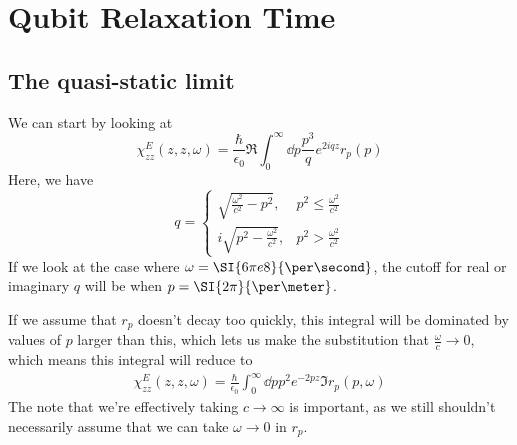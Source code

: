 \documentclass[../../main.tex]{subfiles}
\begin{document}
\section{Qubit Relaxation Time}

\subsection{The quasi-static limit}
We can start by looking at
\begin{equation}
	\chi_{zz}^{E}(z, z, \omega) = \frac{\hbar}{\epsilon_0}\Re\int_0^\infty \dd{p} \frac{p^3}{q} e^{2iqz}r_p(p)
\end{equation}
Here, we have
\begin{equation}
	q = \begin{cases}
			\sqrt{\frac{\omega^2}{c^2} - p^2}, & p^2 \le  \frac{\omega^2}{c^2} \\
			i \sqrt{p^2 - \frac{\omega^2}{c^2}}, & p^2 > \frac{\omega^2}{c^2}
		\end{cases}
\end{equation}
If we look at the case where $\omega = \SI{6\pi e8}{\per\second}$, the cutoff for real or imaginary $q$ will be when $p = \SI{2\pi}{\per\meter}$.

If we assume that $r_p$ doesn't decay too quickly, this integral will be dominated by values of $p$ larger than this, which lets us make the substitution that $\frac{\omega}{c} \rightarrow 0$, which means this integral will reduce to
\begin{align}
	\chi_{zz}^{E}(z, z, \omega) = \frac{\hbar}{\epsilon_0}\int_0^\infty \dd{p} p^2 e^{-2pz}\Im r_p(p, \omega	)
\end{align}
The note that we're effectively taking $c\rightarrow \infty$ is important, as we still shouldn't necessarily assume that we can take $\omega \rightarrow 0$ in $r_p$.
\end{document}
